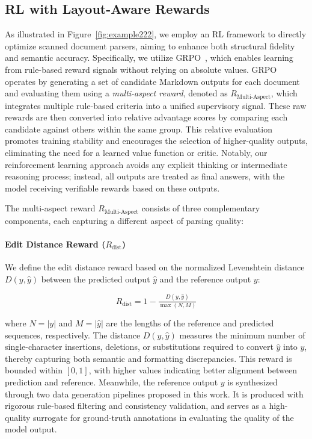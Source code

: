 \subsection{RL with Layout-Aware Rewards}
As illustrated in Figure~\ref{fig:example222}, we employ an RL framework to directly optimize scanned document parsers, aiming to enhance both structural fidelity and semantic accuracy. Specifically, we utilize GRPO~\citep{shao2024deepseekmath}, which enables learning from rule-based reward signals without relying on absolute values. GRPO operates by generating a set of candidate Markdown outputs for each document and evaluating them using a \textit{multi-aspect reward}, denoted as $R_{\text{Multi-Aspect}}$, which integrates multiple rule-based criteria into a unified supervisory signal. These raw rewards are then converted into relative advantage scores by comparing each candidate against others within the same group. This relative evaluation promotes training stability and encourages the selection of higher-quality outputs, eliminating the need for a learned value function or critic. Notably, our reinforcement learning approach avoids any explicit thinking or intermediate reasoning process; instead, all outputs are treated as final answers, with the model receiving verifiable rewards based on these outputs.

The multi-aspect reward $R_{\text{Multi-Aspect}}$ consists of three complementary components, each capturing a different aspect of parsing quality: 






\paragraph{Edit Distance Reward ($R_{\mathrm{dist}}$)}  
We define the edit distance reward based on the normalized Levenshtein distance \( D(y, \hat{y}) \) between the predicted output \( \hat{y} \) and the reference output \( y \):

\vspace{-3mm}
\begin{equation}
R_{\text{dist}} = 1 - \tfrac{D(y, \hat{y})}{\max(N, M)}
\end{equation}
\vspace{-3mm}

where \( N = |y| \) and \( M = |\hat{y}| \) are the lengths of the reference and predicted sequences, respectively. The distance \( D(y, \hat{y}) \) measures the minimum number of single-character insertions, deletions, or substitutions required to convert \( \hat{y} \) into \( y \), thereby capturing both semantic and formatting discrepancies. This reward is bounded within \([0, 1]\), with higher values indicating better alignment between prediction and reference. Meanwhile, the reference output \( y \) is synthesized through two data generation pipelines proposed in this work. It is produced with rigorous rule-based filtering and consistency validation, and serves as a high-quality surrogate for ground-truth annotations in evaluating the quality of the model output.





